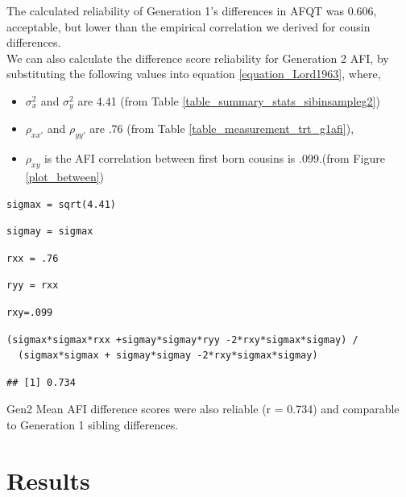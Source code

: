 \documentclass[a4paper,man,apacite,natbib,12pt,longtable]{apa6}\usepackage[]{graphicx}\usepackage[]{color}
\makeatletter
\newenvironment{kframe}{%
 \def\at@end@of@kframe{}%
 \ifinner\ifhmode%
  \def\at@end@of@kframe{\end{minipage}}%
  \begin{minipage}{\columnwidth}%
 \fi\fi%
 \def\FrameCommand##1{\hskip\@totalleftmargin \hskip-\fboxsep
 \colorbox{shadecolor}{##1}\hskip-\fboxsep
     \hskip-\linewidth \hskip-\@totalleftmargin \hskip\columnwidth}%
 \MakeFramed {\advance\hsize-\width
   \@totalleftmargin\z@ \linewidth\hsize
   \@setminipage}}%
 {\par\unskip\endMakeFramed%
 \at@end@of@kframe}
\newenvironment{knitrout}{}{} %
\makeatother
\begin{document}
The calculated reliability of Generation 1's differences in AFQT was 0.606, acceptable, but lower than the empirical correlation we derived for cousin differences.\\

We can also calculate the difference score reliability for Generation 2 AFI, by substituting the following values into equation \ref{equation_Lord1963},
where, \begin{itemize}
\item $\sigma_{x}^{2}$ and $\sigma_{y}^{2}$ are 4.41 (from Table \vref{table_summary_stats_sibinsampleg2}) %
\item $\rho_{xx'}$ and $\rho_{yy'}$ are .76 (from Table \vref{table_measurement_trt_g1afi}), 
\item $\rho_{xy}$ is the AFI correlation between first born cousins is .099.(from Figure \vref{plot_between})\end{itemize}
\begin{knitrout}
\color{fgcolor}\begin{kframe}
\begin{lstlisting}[style=Rsettings]
sigmax = sqrt(4.41)\end{lstlisting}
\begin{lstlisting}[style=Rsettings]
sigmay = sigmax\end{lstlisting}
\begin{lstlisting}[style=Rsettings]
rxx = .76\end{lstlisting}
\begin{lstlisting}[style=Rsettings]
ryy = rxx\end{lstlisting}
\begin{lstlisting}[style=Rsettings]
rxy=.099\end{lstlisting}
\begin{lstlisting}[style=Rsettings]
(sigmax*sigmax*rxx +sigmay*sigmay*ryy -2*rxy*sigmax*sigmay) / 
  (sigmax*sigmax + sigmay*sigmay -2*rxy*sigmax*sigmay)\end{lstlisting}
\begin{lstlisting}[style=Rsettings]
## [1] 0.734
\end{lstlisting}
\end{kframe}
\end{knitrout}

 Gen2 Mean AFI difference scores were also reliable (r = 0.734) and comparable to Generation 1 sibling differences.
\section{Results}

%
\end{document}
